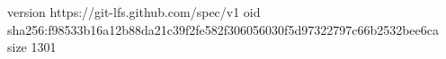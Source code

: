 version https://git-lfs.github.com/spec/v1
oid sha256:f98533b16a12b88da21c39f2fe582f306056030f5d97322797c66b2532bee6ca
size 1301
